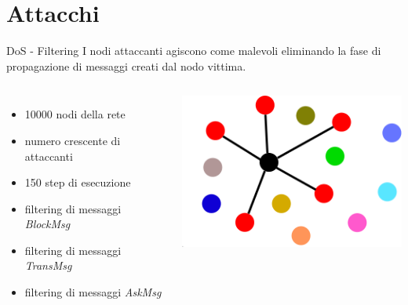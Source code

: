 \documentclass{beamer}
\begin{document}

\section{Attacchi}

\begin{frame}{DoS - Filtering}
	I nodi attaccanti agiscono come malevoli eliminando la fase di propagazione di messaggi creati dal nodo vittima.
    
    \begin{columns}
    		\begin{itemize}
    			\item 10000 nodi della rete
        		\item numero crescente di attaccanti
                \item 150 step di esecuzione
        		\item filtering di messaggi \textit{BlockMsg}
        		\item filtering di messaggi \textit{TransMsg}
        		\item filtering di messaggi \textit{AskMsg}
    		\end{itemize}
            
			\includegraphics[width=\linewidth]{./images/sybil.png}
	\end{columns}
\end{frame}
\end{document}
